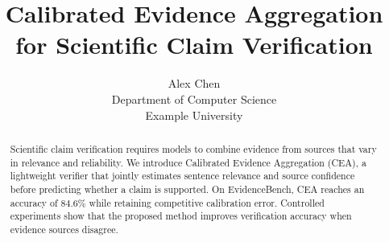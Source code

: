 \documentclass[11pt]{article}
\title{Calibrated Evidence Aggregation for Scientific Claim Verification}
\author{Alex Chen \\ Department of Computer Science \\ Example University}
\date{}
\begin{document}
\maketitle

\begin{abstract}
Scientific claim verification requires models to combine evidence from sources that
vary in relevance and reliability. We introduce Calibrated Evidence Aggregation (CEA),
a lightweight verifier that jointly estimates sentence relevance and source confidence
before predicting whether a claim is supported. On EvidenceBench, CEA reaches an
accuracy of $84.6\%$ while retaining competitive calibration error. Controlled
experiments show that the proposed method improves verification accuracy when evidence
sources disagree.
\end{abstract}









\end{document}
